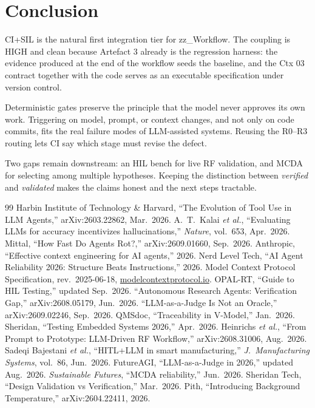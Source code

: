 \documentclass[11pt,a4paper]{article}
\begin{document}
\section{Conclusion}

CI+SIL is the natural first integration tier for zz\_Workflow. The coupling is HIGH and
clean because Artefact 3 already is the regression harness: the evidence produced at
the end of the workflow seeds the baseline, and the Ctx 03 contract together with the
code serves as an executable specification under version control.

Deterministic gates preserve the principle that the model never approves its own work.
Triggering on model, prompt, or context changes, and not only on code commits, fits the
real failure modes of LLM-assisted systems. Reusing the R0--R3 routing lets CI say which
stage must revise the defect.

Two gaps remain downstream: an HIL bench for live RF validation, and MCDA for
selecting among multiple hypotheses. Keeping the distinction between \emph{verified}
and \emph{validated} makes the claims honest and the next steps tractable.

\begin{thebibliography}{99}\small
\setlength{\itemsep}{2pt}
 Harbin Institute of Technology \& Harvard, ``The Evolution of Tool Use in LLM Agents,'' arXiv:2603.22862, Mar.\ 2026.
 A.\ T.\ Kalai \emph{et al.}, ``Evaluating LLMs for accuracy incentivizes hallucinations,'' \emph{Nature}, vol.\ 653, Apr.\ 2026.
 Mittal, ``How Fast Do Agents Rot?,'' arXiv:2609.01660, Sep.\ 2026.
 Anthropic, ``Effective context engineering for AI agents,'' 2026.
 Nerd Level Tech, ``AI Agent Reliability 2026: Structure Beats Instructions,'' 2026.
 Model Context Protocol Specification, rev.\ 2025-06-18, \url{modelcontextprotocol.io}.
 OPAL-RT, ``Guide to HIL Testing,'' updated Sep.\ 2026.
 ``Autonomous Research Agents: Verification Gap,'' arXiv:2608.05179, Jun.\ 2026.
 ``LLM-as-a-Judge Is Not an Oracle,'' arXiv:2609.02246, Sep.\ 2026.
 QMSdoc, ``Traceability in V-Model,'' Jan.\ 2026.
 Sheridan, ``Testing Embedded Systems 2026,'' Apr.\ 2026.
 Heinrichs \emph{et al.}, ``From Prompt to Prototype: LLM-Driven RF Workflow,'' arXiv:2608.31006, Aug.\ 2026.
 Sadeqi Bajestani \emph{et al.}, ``HITL+LLM in smart manufacturing,'' \emph{J.\ Manufacturing Systems}, vol.\ 86, Jun.\ 2026.
 FutureAGI, ``LLM-as-a-Judge in 2026,'' updated Aug.\ 2026.
 \emph{Sustainable Futures}, ``MCDA reliability,'' Jun.\ 2026.
 Sheridan Tech, ``Design Validation vs Verification,'' Mar.\ 2026.
 Pith, ``Introducing Background Temperature,'' arXiv:2604.22411, 2026.
\end{thebibliography}
\end{document}
